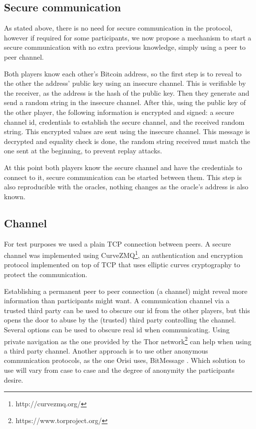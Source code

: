 \subsection{Secure communication} \label{subsec:secure_comm}

As stated above, there is no need for secure communication in the protocol,
  however if required for some participants, we now propose a mechanism to
  start a secure communication with no extra previous knowledge, simply using
  a peer to peer channel.

Both players know each other's Bitcoin address, so the first step is to
  reveal to the other the address' public key using an insecure channel.
This is verifiable by the receiver, as the address is the hash of the public
  key.
Then they generate and send a random string in the insecure channel.
After this, using the public key of the other player, the following
  information is encrypted and signed:
a secure channel id, credentials to establish the secure channel, and the
  received random string. This encrypted values are sent using the insecure
  channel.
This message is decrypted and equality check is done, the random string
  received must match the one sent at the beginning, to prevent replay
  attacks.

At this point both players know the secure channel and have the credentials
  to connect to it, secure communication can be started between them. This
  step is also reproducible with the oracles, nothing changes as the oracle's
  address is also known.

\subsection{Channel}

For test purposes we used a plain TCP connection between peers.
A secure channel was implemented using
  CurveZMQ\footnote{http://curvezmq.org/}, an authentication and encryption
  protocol implemented on top of TCP that uses elliptic curves cryptography to
  protect the communication.

Establishing a permanent peer to peer connection (a channel) might reveal more
  information than participants might want.
A communication channel via a trusted third party can be used to obscure our id
  from the other players, but this opens the door to abuse by the (trusted)
  third party controlling the channel.
Several options can be used to obscure real id when communicating.
Using private navigation as the one provided by the Thor network\footnote{%
    https://www.torproject.org/} can help when using a third party channel.
Another approach is to use other anonymous communication protocols, as the
  one Orisi uses, BitMessage \cite{warren2012bitmessage}.
Which solution to use will vary from case to case and the degree of anonymity
  the participants desire.

